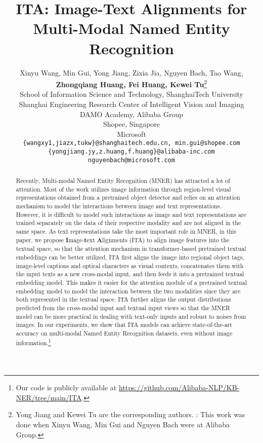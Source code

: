 \documentclass[11pt]{article}
\title{ITA: Image-Text Alignments for Multi-Modal Named Entity Recognition}
\author{Xinyu Wang, Min Gui, Yong Jiang\textsuperscript{}, Zixia Jia, Nguyen Bach, Tao Wang,\\
\textbf{Zhongqiang Huang, Fei Huang,  Kewei Tu}\thanks{\hspace{1mm} Yong Jiang and Kewei Tu are the corresponding authors. : This work was done when Xinyu Wang, Min Gui and Nguyen Bach were at Alibaba Group. } \\
 School of Information Science and Technology, ShanghaiTech University \\
 Shanghai Engineering Research Center of Intelligent Vision and Imaging \\
 DAMO Academy, Alibaba Group \\
 Shopee, Singapore \\
 Microsoft \\
  {\tt \{wangxy1,jiazx,tukw\}@shanghaitech.edu.cn, min.gui@shopee.com} \\
  {\tt \{yongjiang.jy,z.huang,f.huang\}@alibaba-inc.com} \\
  {\tt nguyenbach@microsoft.com} \\
}
\begin{document}
\maketitle

\begin{abstract}
Recently, Multi-modal Named Entity Recognition (MNER) has attracted a lot of attention. Most of the work utilizes image information through region-level visual representations obtained from a pretrained object detector and  relies on an attention mechanism to model the interactions between image and text representations. However, it is difficult to model such interactions as image and text representations are trained separately on the data of their respective modality and are not aligned in the same space. As text representations take the most important role in MNER, in this paper, we propose {\bf I}mage-{\bf t}ext {\bf A}lignments (ITA) to  align image features into the textual space, so that the attention mechanism in transformer-based pretrained textual embeddings can be better utilized. ITA first aligns the image into regional object tags, image-level captions and optical characters as visual contexts, concatenates them with the input texts as a new cross-modal input, and then feeds it into a pretrained textual embedding model. This makes it easier for the attention module of a pretrained textual embedding model to model the interaction between the two modalities since they are both represented in the textual space. ITA further aligns the output distributions predicted from the cross-modal input and textual input views so that the MNER model can be more practical in dealing with text-only inputs and robust to noises from images. In our experiments, we show that ITA models can achieve state-of-the-art accuracy on multi-modal Named Entity Recognition datasets, even without image information.\footnote{Our code is publicly available at \url{https://github.com/Alibaba-NLP/KB-NER/tree/main/ITA}.}




\end{abstract}
\end{document}
